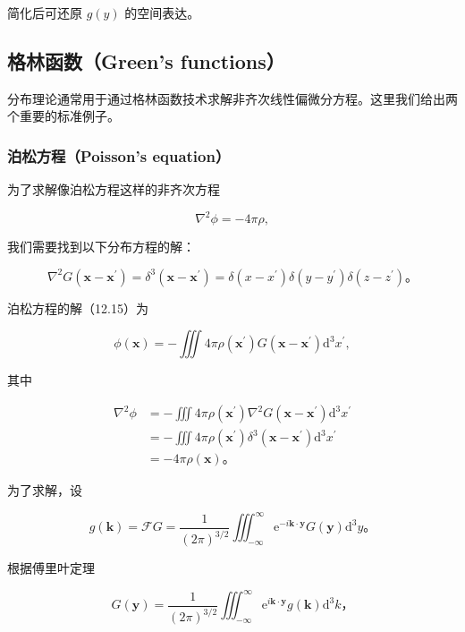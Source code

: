 简化后可还原 \(g(y)\) 的空间表达。

\subsection{格林函数（Green's
functions）}\label{ux683cux6797ux51fdux6570greens-functions}

分布理论通常用于通过格林函数技术求解非齐次线性偏微分方程。这里我们给出两个重要的标准例子。

\subsubsection{泊松方程（Poisson's
equation）}\label{ux6ccaux677eux65b9ux7a0bpoissons-equation}

为了求解像泊松方程这样的非齐次方程

\[\nabla^{2}\phi = - 4\pi\rho,\]

我们需要找到以下分布方程的解：

\[\nabla^{2}G\left( \mathbf{x} - \mathbf{x}^{\prime} \right) = \delta^{3}\left( \mathbf{x} - \mathbf{x}^{\prime} \right) = \delta\left( x - x^{\prime} \right)\delta\left( y - y^{\prime} \right)\delta\left( z - z^{\prime} \right)。\]

泊松方程的解（12.15）为

\[\phi\left( \mathbf{x} \right) = - \iiint 4\pi\rho\left( \mathbf{x}^{\prime} \right)G\left( \mathbf{x} - \mathbf{x}^{\prime} \right)\mathrm{d}^{3}x^{\prime},\]

其中

\[\begin{aligned}
\nabla^{2}\phi & = - \iiint 4\pi\rho\left( \mathbf{x}^{\prime} \right)\nabla^{2}G\left( \mathbf{x} - \mathbf{x}^{\prime} \right)\mathrm{d}^{3}x^{\prime} \\
 & = - \iiint 4\pi\rho\left( \mathbf{x}^{\prime} \right)\delta^{3}\left( \mathbf{x} - \mathbf{x}^{\prime} \right)\mathrm{d}^{3}x^{\prime} \\
 & = - 4\pi\rho\left( \mathbf{x} \right)。
\end{aligned}\]

为了求解，设

\[g\left( \mathbf{k} \right) = \mathcal{F}G = \frac{1}{(2\pi)^{3/2}}\iiint_{- \infty}^{\infty}\mathrm{e}^{- i\mathbf{k} \cdot \mathbf{y}}G\left( \mathbf{y} \right)\mathrm{d}^{3}y。\]

根据傅里叶定理

\[G\left( \mathbf{y} \right) = \frac{1}{(2\pi)^{3/2}}\iiint_{- \infty}^{\infty}\mathrm{e}^{i\mathbf{k} \cdot \mathbf{y}}g\left( \mathbf{k} \right)\mathrm{d}^{3}k，\]

